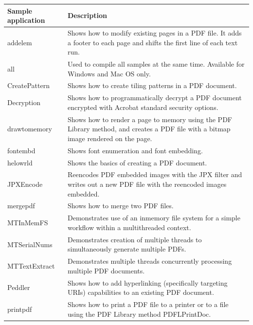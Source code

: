 \documentclass[letterpaper,12pt,english,openany,oneside]{sphinxmanual}
\begin{document}
\begin{savenotes}\sphinxattablestart
\centering
{}\label{\detokenize{Plugins_CreatingSimplePlug:section-1}}\nobreak
\begin{tabulary}{\linewidth}[t]{|T|T|}
\hline
\sphinxstyletheadfamily 
Sample application
&\sphinxstyletheadfamily 
Description
\\
\hline
addelem
&
Shows how to modify existing pages in a PDF file. It adds a footer to each page and shifts the first line of each text run.
\\
\hline
all
&
Used to compile all samples at the same time. Available for Windows and Mac OS only.
\\
\hline
CreatePattern
&
Shows how to create tiling patterns in a PDF document.
\\
\hline
Decryption
&
Shows how to programmatic\sphinxhyphen{}ally decrypt a PDF document encrypted with Acrobat standard security options.
\\
\hline
drawtomemory
&
Shows how to render a page to memory using the  PDF Library method, and creates a PDF file with a bitmap image rendered on the page.
\\
\hline
fontembd
&
Shows font enumeration and font embedding.
\\
\hline
helowrld
&
Shows the basics of creating a PDF document.
\\
\hline
JPXEncode
&
Re\sphinxhyphen{}encodes PDF embedded images with the JPX filter and writes out a new PDF file with the re\sphinxhyphen{}encoded images embedded.
\\
\hline
mergepdf
&
Shows how to merge two PDF files.
\\
\hline
MTInMemFS
&
Demonstrates use of an in\sphinxhyphen{}memory file system for a simple workflow within a multi\sphinxhyphen{}threaded context.
\\
\hline
MTSerialNums
&
Demonstrates creation of multiple threads to simultaneously generate multiple PDFs.
\\
\hline
MTTextExtract
&
Demonstrates multiple threads concurrently processing multiple PDF documents.
\\
\hline
Peddler
&
Shows how to add hyperlinking (specifically targeting URIs) capabilities to an existing PDF document.
\\
\hline
printpdf
&
Shows how to print a PDF file to a printer or to a file using the PDF Library method PDFLPrintDoc.
\\
\hline
\end{tabulary}
\par
\sphinxattableend\end{savenotes}
\end{document}
